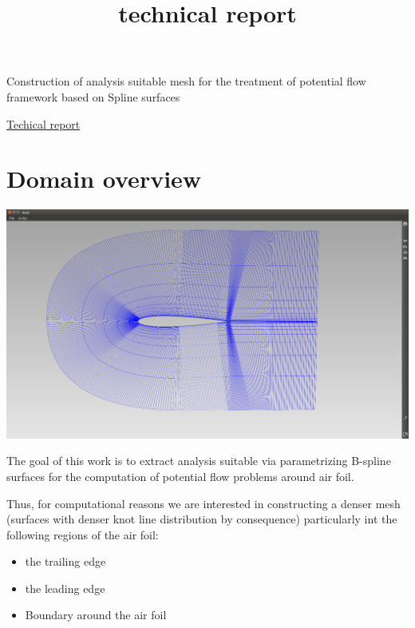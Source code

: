 \documentclass[12pt,a4paper]{article}
\title{technical report}
\begin{document}
\begin{titlepage}

\begin{center}
\LARGE Construction of analysis suitable mesh for the treatment of potential flow framework based on Spline surfaces

\end{center}
\begin{center}
 \Large \underline {Techical report}
\end{center}

\end{titlepage}



\tableofcontents
\pagebreak
\section{Domain overview}


\begin{center}
\includegraphics[scale=0.2]{SURFACES_AROUND_AIRFOIL.png} 
\end{center}


The goal of this work is to extract analysis suitable via parametrizing B-spline surfaces for the computation of potential flow problems around air foil.

Thus, for computational reasons we are interested in constructing a denser mesh (surfaces with denser knot line distribution by consequence) particularly int the following regions of the air foil:

\begin{itemize}
\item the trailing edge
\item the leading edge
\item Boundary around the  air foil

\end{itemize}
\end{document}
